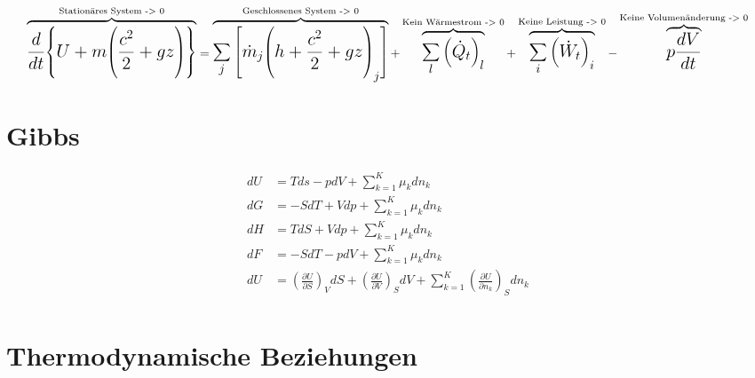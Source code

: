 \documentclass[twocolumn]{article}
\begin{document}
\begin{equation*}
\Large
	\overbrace{
	\frac{d}{dt}\Bigg{\{} U 
	+
	m \Bigg{(}\frac{c^2}{2}+gz\Bigg{)}\Bigg{\}}}
	^{\text{Stationäres System -> 0}} 
	=
	\overbrace{
	\sum_{j}{\Bigg{[}\dot{m}_j\Bigg{(}h+\frac{c^2}{2}+gz\Bigg{)}_j \Bigg{]}}}
	^{\text{Geschlossenes System -> 0}}  
	+
	\overbrace{
	\sum_{l}^{} \Big(\dot{Q}_t\Big)_l}
	^{\text{Kein Wärmestrom -> 0}} 
	+
	\overbrace{
	\sum_{i}\Big(\dot{W}_t\Big)_i}
	^{\text{Keine Leistung -> 0}}
	-
	\overbrace{
	p\frac{dV}{dt}}
	^{\text{Keine Volumenänderung -> 0}}
\end{equation*}
\section{Gibbs}

\begin{align*}
	dU &=  Tds - pdV + \sum_{k=1}^{K} \mu_k dn_k \\
	dG &= -SdT + Vdp + \sum_{k=1}^{K} \mu_k dn_k \\ dH &=  TdS + Vdp + \sum_{k=1}^{K} \mu_k dn_k \\
	dF &= -SdT - pdV + \sum_{k=1}^{K} \mu_k dn_k \\
	dU &= 	\left(\frac{\partial U}{\partial S}\right)_{V} dS 
	+ 	\left(\frac{\partial U}{\partial V}\right)_{S} dV 
	+ 	\sum_{k=1}^{K} \left(\frac{\partial U}{\partial n_k}\right)_{S} dn_k  \\
\end{align*}


\section{Thermodynamische Beziehungen}
\end{document}
